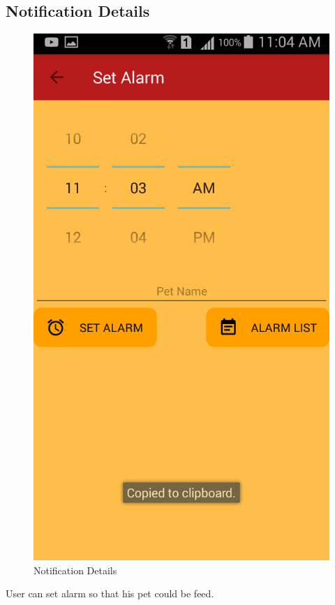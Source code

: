 \newpage
\subsection{Notification Details}
\begin{figure}[H] 
  \centering
    \includegraphics[scale=0.3]{85Alarmnotification}
    \caption{Notification Details}
\end{figure}

User can set alarm so that his pet could be feed.
\newpage
